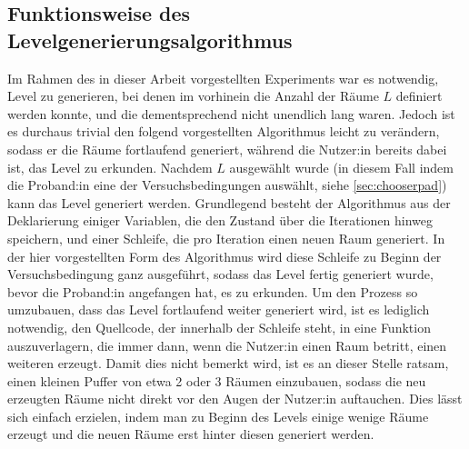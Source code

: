 \subsection{Funktionsweise des Levelgenerierungsalgorithmus}
Im Rahmen des in dieser Arbeit vorgestellten Experiments war es notwendig, Level zu generieren, bei denen im vorhinein die Anzahl der Räume $L$ definiert werden konnte, und die dementsprechend nicht unendlich lang waren. Jedoch ist es durchaus trivial den folgend vorgestellten Algorithmus leicht zu verändern, sodass er die Räume fortlaufend generiert, während die Nutzer:in bereits dabei ist, das Level zu erkunden.
Nachdem $L$ ausgewählt wurde (in diesem Fall indem die Proband:in eine der Versuchsbedingungen auswählt, siehe \autoref{sec:chooserpad})
kann das Level generiert werden.
Grundlegend besteht der Algorithmus aus der Deklarierung einiger Variablen, die den Zustand über die Iterationen hinweg speichern, und einer Schleife, die pro Iteration einen neuen Raum generiert. In der hier vorgestellten Form des Algorithmus wird diese Schleife zu Beginn der Versuchsbedingung ganz ausgeführt, sodass das Level fertig generiert wurde, bevor die Proband:in angefangen hat, es zu erkunden.
Um den Prozess so umzubauen, dass das Level fortlaufend weiter generiert wird, ist es lediglich notwendig, den Quellcode, der innerhalb der Schleife steht, in eine Funktion auszuverlagern, die immer dann, wenn die Nutzer:in einen Raum betritt, einen weiteren erzeugt. Damit dies nicht bemerkt wird, ist es an dieser Stelle ratsam, einen kleinen Puffer von etwa 2 oder 3 Räumen einzubauen, sodass die neu erzeugten Räume nicht direkt vor den Augen der Nutzer:in auftauchen. Dies lässt sich einfach erzielen, indem man zu Beginn des Levels einige wenige Räume erzeugt und die neuen Räume erst hinter diesen generiert werden.


